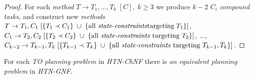 \begin{proof}
    For each \emph{method} $T \rightarrow T_1, \dots, T_k \; [C], \; k \geq 3$ we produce $k - 2$ $C_i$ \emph{compound tasks}, and construct new \emph{methods} $T \rightarrow T_1, C_1 \; [\{T_1 \prec C_1\} \; \cup \; \{\text{all \emph{state-constraints}} \\ \text{targeting} \; T_1\}]$, $C_1 \rightarrow T_2, C_2 \; [\{T_2 \prec C_2\} \; \cup \; \{\text{all \emph{state-constraints} targeting $T_2$}\}]$, $\dots$, $C_{k-2} \rightarrow T_{k-1}, T_k \; [\{T_{k-1} \prec T_k\} \; \cup \; \{\text{all \emph{state-constraints} targeting $T_{k-1}, T_k$}\}]$.
\end{proof}

\begin{thm}\label{thm04:13}
    For each \emph{TO planning problem} in \emph{HTN-ChNF} there is \emph{an equivalent planning problem} in \emph{HTN-GNF}.
\end{thm}

